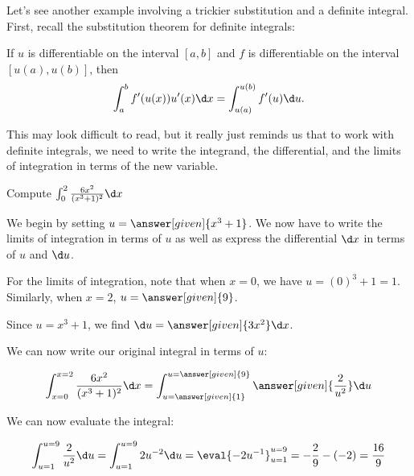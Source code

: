 \documentclass[nooutcomes]{ximera}
\begin{document}
Let's see another example involving a trickier substitution and a definite integral.  First, recall the substitution theorem for definite integrals:

\begin{theorem} 
If $u$ is differentiable on the interval $[a,b]$ and $f$ is
differentiable on the interval $[u(a),u(b)]$, then
\[
\int_a^b f'(u(x)) u'(x) \d x =\int_{u(a)}^{u(b)} f'(u) \d u.
\]
\end{theorem}

This may look difficult to read, but it really just reminds us that to work with definite integrals, we need to write the integrand, the differential, and the limits of integration in terms of the new variable.  

\begin{example}
Compute $\int_0^2 \frac{6x^2}{(x^3+1)^2} \d x$

\begin{explanation}
We begin by setting $u = \answer[given]{x^3+1}$.  We now have to write the limits of integration in terms of $u$ as well as express the differential $\d x$ in terms of $u$ and $\d u$.

For the limits of integration, note that when $x=0$, we have $u = (0)^3+1 = 1$.  Similarly, when $x=2$, $u=\answer[given]{9}$.

Since $u=x^3+1$, we find $\d u = \answer[given]{3x^2} \d x$.

We can now write our original integral in terms of $u$:

\[
\int_{x=0}^{x=2} \frac{6x^2}{(x^3+1)^2} \d x = \int_{u=\answer[given]{1}}^{u=\answer[given]{9}} \answer[given]{\frac{2}{u^2}} \d u
\]

We can now evaluate the integral:

\[
\int_{u=1}^{u=9} \frac{2}{u^2} \d u = \int_{u=1}^{u=9}2u^{-2} \d u = \eval{-2u^{-1}}_{u=1}^{u=9} = -\frac{2}{9} - (-2) = \frac{16}{9}
\]
\end{explanation}
\end{example}
\end{document}
